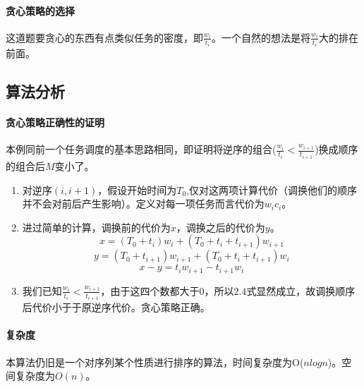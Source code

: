 \paragraph*{贪心策略的选择}
这道题要贪心的东西有点类似任务的密度，即$\frac{w_i}{t_i}$。一个自然的想法是将$\frac{w_i}{t_i}$大的排在前面。

\subsection{算法分析}

\paragraph*{贪心策略正确性的证明}
本例同前一个任务调度的基本思路相同，即证明将逆序的组合($\frac{w_i}{t_i} < \frac{w_{i+1}}{t_{i+1}}$)换成顺序的组合后$M$变小了。

\begin{enumerate}
    \item 对逆序$(i,i+1)$，假设开始时间为$T_0$,仅对这两项计算代价（调换他们的顺序并不会对前后产生影响）。定义对每一项任务而言代价为$w_ic_i$。
    \item 进过简单的计算，调换前的代价为$x$，调换之后的代价为$y$。
    \begin{equation}
        x=(T_0+t_i)w_i+(T_0+t_i+t_{i+1})w_{i+1}
    \end{equation}
    \begin{equation}
        y=(T_0+t_{i+1})w_{i+1}+(T_0+t_i+t_{i+1})w_i
    \end{equation}
    \begin{equation}
        x-y=t_iw_{i+1}-t_{i+1}w_i
    \end{equation}
    \item 我们已知$\frac{w_i}{t_i} < \frac{w_{i+1}}{t_{i+1}}$，由于这四个数都大于0，所以$2.4$式显然成立，故调换顺序后代价小于于原逆序代价。贪心策略正确。
\end{enumerate}

\paragraph*{复杂度}
本算法仍旧是一个对序列某个性质进行排序的算法，时间复杂度为O($nlogn$)。空间复杂度为$O(n)$。
